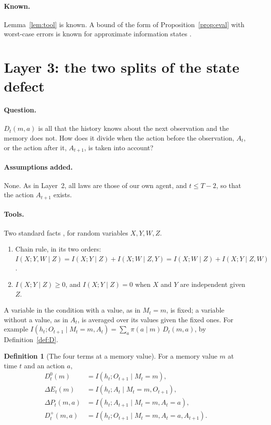 \documentclass{article}
\theoremstyle{definition}
\newtheorem{definition}[proposition]{Definition}
\numberwithin{equation}{section}
\newcommand{\dE}{\Delta E}
\newcommand{\dP}{\Delta P}
\begin{document}
\paragraph{Known.} Lemma~\ref{lem:tool} is known. A bound of the form of Proposition~\ref{prop:eval} with worst-case errors is known for approximate information states \citep{subramanian2022approximate}.

\section{Layer 3: the two splits of the state defect}\label{sec:layer3}

\paragraph{Question.} $D_t(m,a)$ is all that the history knows about the next observation and the memory does not. How does it divide when the action before the observation, $A_t$, or the action after it, $A_{t+1}$, is taken into account?

\paragraph{Assumptions added.} None. As in Layer~2, all laws are those of our own agent, and $t\le T-2$, so that the action $A_{t+1}$ exists.

\paragraph{Tools.} Two standard facts \citep[Ch.~2]{cover2006elements}, for random variables $X,Y,W,Z$.
\begin{enumerate}
\item[(T1)] Chain rule, in its two orders: $I(X;Y,W\mid Z)=I(X;Y\mid Z)+I(X;W\mid Z,Y)=I(X;W\mid Z)+I(X;Y\mid Z,W)$.
\item[(T2)] $I(X;Y\mid Z)\ge0$, and $I(X;Y\mid Z)=0$ when $X$ and $Y$ are independent given $Z$.
\end{enumerate}
A variable in the condition with a value, as in $M_t=m$, is fixed; a variable without a value, as in $A_t$, is averaged over its values given the fixed ones. For example $I(h_t;O_{t+1}\mid M_t=m,A_t)=\sum_a\pi(a\mid m)\,D_t(m,a)$, by Definition~\ref{def:D}.

\begin{definition}[The four terms at a memory value]\label{def:four-terms}
For a memory value $m$ at time $t$ and an action $a$,
\begin{align*}
D^0_t(m)&=I(h_t;O_{t+1}\mid M_t=m),\\
\dE_t(m)&=I(h_t;A_t\mid M_t=m,O_{t+1}),\\
\dP_t(m,a)&=I(h_t;A_{t+1}\mid M_t=m,A_t=a),\\
D^+_t(m,a)&=I(h_t;O_{t+1}\mid M_t=m,A_t=a,A_{t+1}).
\end{align*}
\end{definition}
\end{document}
